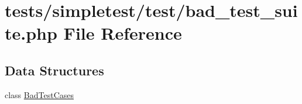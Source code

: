 \hypertarget{bad__test__suite_8php}{\section{tests/simpletest/test/bad\-\_\-test\-\_\-suite.php File Reference}
\label{bad__test__suite_8php}
}
\subsection*{Data Structures}
\begin{DoxyCompactItemize}
\item 
class \hyperlink{class_bad_test_cases}{Bad\-Test\-Cases}
\end{DoxyCompactItemize}
